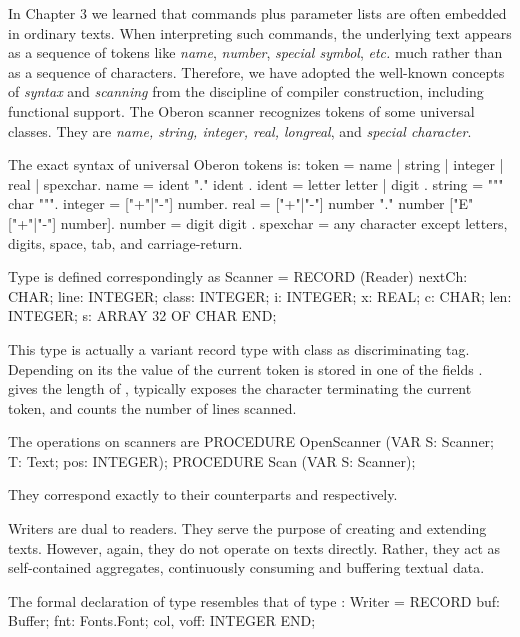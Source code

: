 \noindent In Chapter 3 we learned that commands plus parameter lists are often
embedded in ordinary texts. When interpreting such commands, the
underlying text appears as a sequence of tokens like \emph{name}, \emph{number}, \emph{special symbol}, \emph{etc.} much rather than as a sequence of
characters. Therefore, we have adopted the well-known concepts of
\emph{syntax} and \emph{scanning} from the discipline of compiler construction, including functional support. The Oberon scanner recognizes tokens of
some universal classes. They are \emph{name, string, integer, real,
longreal}, and \emph{special character}.

The exact syntax of universal Oberon tokens is:
\begintt
token = name | string | integer | real | spexchar.
name = ident { "." ident }.
ident = letter { letter | digit }.
string = """ { char } """.
integer = ["+"|"-"] number.
real = ["+"|"-"] number "." number ["E" ["+"|"-"] number].
number = digit { digit }.
spexchar = any character except letters, digits, space, tab,
               and carriage-return.
\endtt

\noindent Type  is defined correspondingly as
\begintt
Scanner = RECORD (Reader)
  nextCh: CHAR;
  line: INTEGER;
  class: INTEGER;
  i: INTEGER;
  x: REAL;
  c: CHAR;
  len: INTEGER;
  s: ARRAY 32 OF CHAR
END;
\endtt

\noindent This type is actually a variant record type with class as
discriminating tag. Depending on its  the value of the current
token is stored in one of the fields .  gives the length of ,  typically exposes the character terminating the current token, and  counts the number of lines scanned.

The operations on scanners are
\begintt
PROCEDURE OpenScanner (VAR S: Scanner; T: Text; pos: INTEGER);
PROCEDURE Scan (VAR S: Scanner);
\endtt

\noindent They correspond exactly to their counterparts  and  respectively.

Writers are dual to readers. They serve the purpose of creating and
extending texts. However, again, they do not operate on texts
directly. Rather, they act as self-contained aggregates, continuously
consuming and buffering textual data.

The formal declaration of type  resembles that of type :
\begintt
Writer = RECORD buf:
  Buffer;
  fnt: Fonts.Font;
  col, voff: INTEGER
END;
\endtt

